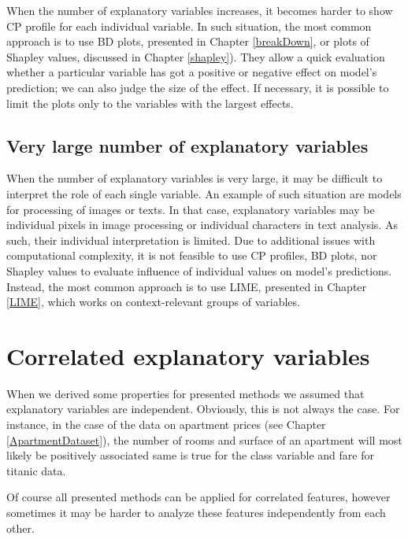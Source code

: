 \documentclass[]{krantz}
\begin{document}
When the number of explanatory variables increases, it becomes harder to show CP profile for each individual variable. In such situation, the most common approach is to use BD plots, presented in Chapter \ref{breakDown}, or plots of Shapley values, discussed in Chapter \ref{shapley}). They allow a quick evaluation whether a particular variable has got a positive or negative effect on model's prediction; we can also judge the size of the effect. If necessary, it is possible to limit the plots only to the variables with the largest effects.

\hypertarget{very-large-number-of-explanatory-variables}{%
\subsection{Very large number of explanatory variables}\label{very-large-number-of-explanatory-variables}}

When the number of explanatory variables is very large, it may be difficult to interpret the role of each single variable. An example of such situation are models for processing of images or texts. In that case, explanatory variables may be individual pixels in image processing or individual characters in text analysis. As such, their individual interpretation is limited. Due to additional issues with computational complexity, it is not feasible to use CP profiles, BD plots, nor Shapley values to evaluate influence of individual values on model's predictions. Instead, the most common approach is to use LIME, presented in Chapter \ref{LIME}, which works on context-relevant groups of variables.

\hypertarget{correlated-explanatory-variables}{%
\section{Correlated explanatory variables}\label{correlated-explanatory-variables}}

When we derived some properties for presented methods we assumed that explanatory variables are independent. Obviously, this is not always the case. For instance, in the case of the data on apartment prices (see Chapter \ref{ApartmentDataset}), the number of rooms and surface of an apartment will most likely be positively associated same is true for the class variable and fare for titanic data.

Of course all presented methods can be applied for correlated features, however sometimes it may be harder to analyze these features independently from each other.
\end{document}
